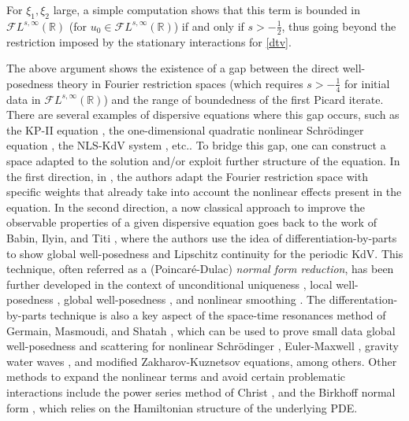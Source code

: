 \documentclass[a4paper,
11pt,  reqno]{amsart}
\newcommand{\5}{\textup{V}}
\theoremstyle{remark}
\newcommand{\R}{\mathbb{R}}
\numberwithin{equation}{section}
\numberwithin{theorem}{section}
\begin{document}
	For $\xi_1, \xi_2$ large,
	a simple computation shows that this term is bounded in $\mathcal{F}L^{s,\infty}(\R)$ (for $u_0\in \mathcal{F}L^{s,\infty}(\R)$) if and only if $s>-\frac12$, thus going beyond the restriction imposed by the stationary interactions for \eqref{dtv}.

	\medskip
	The above argument shows the existence of a gap between the direct well-posedness theory in Fourier restriction spaces (which requires $s>-\frac14$ for initial data in $\mathcal{F}L^{s,\infty}(\R)$) and the range of boundedness of the first Picard iterate. There are several examples of dispersive equations where this gap occurs, such as the KP-II equation \cite{hadac, HHK_kpii}, the one-dimensional quadratic nonlinear Schrödinger equation \cite{taobejenaru, OS12}, the NLS-KdV system \cite{CLS}, etc..
To bridge this gap, one can construct a space adapted to the solution and/or exploit further structure of the equation.
In the first direction,
in \cite{taobejenaru, hadac, HHK_kpii}, the authors adapt the Fourier restriction space with specific weights that already take into account the nonlinear effects present in the equation.
In the second direction, a now classical approach to improve the observable properties of a given dispersive equation goes back to the work of Babin, Ilyin, and Titi \cite{bit}, where the authors use the idea of differentiation-by-parts to show global well-posedness and Lipschitz continuity for the periodic KdV.
This technique, often referred as a (Poincaré-Dulac) \emph{normal form reduction},
has been further developed in the context of unconditional uniqueness \cite{GuoKwonOh_nls, kishimoto, KwonOh_uu_mkdv, KOY20}, local well-posedness \cite{CLS}, global well-posedness \cite{CGKO_normal_form, IfrimTataru}, and nonlinear smoothing \cite{CKV, CS20,  ErdoganTzirakis_kdv, ErdoganTzirakis_nls, McConnel_nls}.
The differentation-by-parts technique is also a key aspect of the space-time resonances method of Germain, Masmoudi, and Shatah \cite{GMS_nls_3d}, which can be used to prove small data global well-posedness and scattering for nonlinear Schr\"odinger \cite{katopusateri}, Euler-Maxwell \cite{GermainMasmoudi_euler_maxwell}, gravity water waves \cite{GMS_gravity}, and modified Zakharov-Kuznetsov \cite{anjolras} equations, among others.
 Other methods to expand the nonlinear terms and avoid certain problematic interactions include the power series method of Christ \cite{Christ_power}, and the Birkhoff normal form \cite{Bambusi_birkhoff, bourg_birkhoff_normal, CollianderKwonOh_birkhoff}, which relies on the Hamiltonian structure of the underlying PDE.
\end{document}
